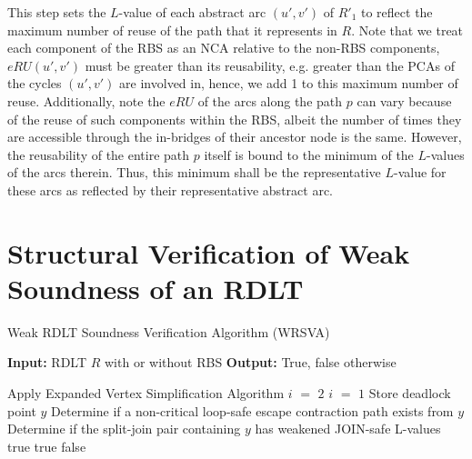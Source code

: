 \begin{algorithm}
\begin{enumerate}
        This step sets the $L$-value  of each abstract arc $(u',v')$ of $R'_1$ to reflect the maximum number of reuse of the path that it represents in $R$. Note that we treat each component of the RBS as an NCA relative to the non-RBS components, $eRU(u',v')$ must be greater than its reusability, e.g. greater than the PCAs of the cycles $(u',v')$ are involved in, hence, we add 1 to this maximum number of reuse. Additionally, note the $eRU$ of the arcs along the path $p$ can vary because of the reuse of such components within the RBS, albeit the number of times they are accessible through the in-bridges of their ancestor node is the same. However, the reusability of the entire path $p$ itself is bound to the minimum of the $L$-values of the arcs therein. Thus, this minimum shall be the representative $L$-value for these arcs as reflected by their representative abstract arc.
    \end{enumerate}
\end{algorithm}


\section*{Structural Verification of Weak Soundness of an RDLT}
\begin{algorithm}[H]
    \caption{Weak RDLT Soundness Verification Algorithm (WRSVA) }
    \label{WeakAlg}
    \begin{algorithmic}
        \State \textbf{Input:} RDLT $ R $ with or without RBS
        \State \textbf{Output:} True, false otherwise
    \end{algorithmic}
    \begin{algorithmic}[1]
        \State Apply Expanded Vertex Simplification Algorithm \cite{MalinaoWCTP2023}
            \State $ i $ $ = $ $ 2 $
        \Else
            \State $ i $ $ = $ $ 1 $
        \EndIf
                \State Store deadlock point $ y $
            \EndFor
                \State Determine if a non-critical loop-safe escape contraction path exists from $ y $
                \State Determine if the split-join pair containing $ y $ has weakened JOIN-safe L-values
            \EndFor            
        \EndFor
                    \State \Return true
                \EndIf
            \EndIf
            \State \Return true
        \Else
            \State \Return false
        \EndIf
    \end{algorithmic}
\end{algorithm}


